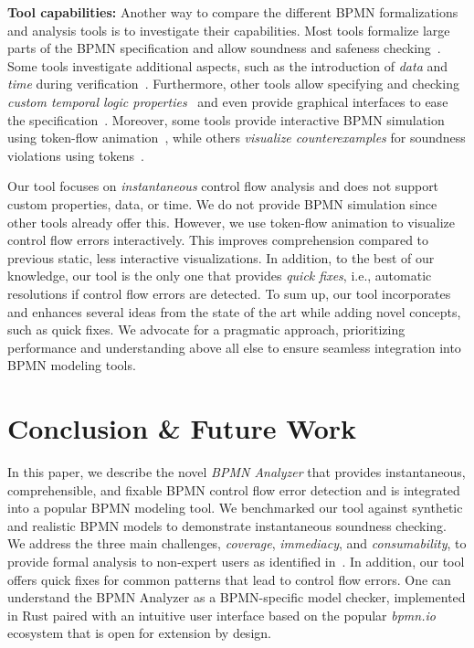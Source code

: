 \documentclass[
onecolumn, %
]{ceurart}
\begin{document}
\textbf{Tool capabilities:}
Another way to compare the different BPMN formalizations and analysis tools is to investigate their capabilities.
Most tools formalize large parts of the BPMN specification and allow soundness and safeness checking~\cite{krauterHigherorderTransformationApproach2024,corradiniFormalApproachAnalysis2021,houhouFirstOrderLogicVerification2022}.
Some tools investigate additional aspects, such as the introduction of \textit{data} and \textit{time} during verification~\cite{houhouFirstOrderLogicVerification2022,corradiniFormalisingAnimatingMultiple2022}.
Furthermore, other tools allow specifying and checking \textit{custom temporal logic properties}~\cite{krauterHigherorderTransformationApproach2024,corradiniFormalApproachAnalysis2021} and even provide graphical interfaces to ease the specification~\cite{krauterHigherorderTransformationApproach2024}.
Moreover, some tools provide interactive BPMN simulation using token-flow animation~\cite{corradiniFormalisingAnimatingMultiple2022,camundaservicesgmbhBpmnjsTokenSimulation2024}, while others \textit{visualize counterexamples} for soundness violations using tokens~\cite{houhouFirstOrderLogicVerification2022}.

Our tool focuses on \textit{instantaneous} control flow analysis and does not support custom properties, data, or time.
We do not provide BPMN simulation since other tools already offer this.
However, we use token-flow animation to visualize control flow errors interactively.
This improves comprehension compared to previous static, less interactive visualizations.
In addition, to the best of our knowledge, our tool is the only one that provides \textit{quick fixes}, i.e., automatic resolutions if control flow errors are detected.
To sum up, our tool incorporates and enhances several ideas from the state of the art while adding novel concepts, such as quick fixes.
We advocate for a pragmatic approach, prioritizing performance and understanding above all else to ensure seamless integration into BPMN modeling tools.

\section{Conclusion \& Future Work} \label{sec:conclusion}

In this paper, we describe the novel \textit{BPMN Analyzer} that provides instantaneous, comprehensible, and fixable BPMN control flow error detection and is integrated into a popular BPMN modeling tool.
We benchmarked our tool against synthetic and realistic BPMN models to demonstrate instantaneous soundness checking.
We address the three main challenges, \textit{coverage}, \textit{immediacy}, and \textit{consumability}, to provide formal analysis to non-expert users as identified in~\cite{fahlandAnalysisDemandInstantaneous2011}.
In addition, our tool offers quick fixes for common patterns that lead to control flow errors.
One can understand the BPMN Analyzer as a BPMN-specific model checker, implemented in Rust paired with an intuitive user interface based on the popular \textit{bpmn.io} ecosystem that is open for extension by design.
\end{document}
